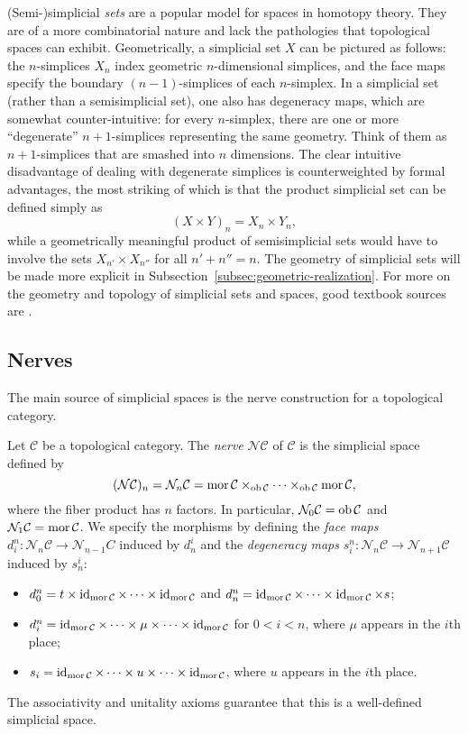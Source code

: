\documentclass[a4paper,openany]{scrbook}
\renewcommand{\C}{\mathcal C}
\newcommand{\nerve}{\mathcal N}
\begin{document}
(Semi-)simplicial \emph{sets} are a popular model for spaces in homotopy theory. They are of a more combinatorial nature and lack the pathologies that topological spaces can exhibit. Geometrically, a simplicial set $X$ can be pictured as follows: the $n$-simplices $X_n$ index geometric $n$-dimensional simplices, and the face maps specify the boundary $(n-1)$-simplices of each $n$-simplex. In a simplicial set (rather than a semisimplicial set), one also has degeneracy maps, which are somewhat counter-intuitive: for every $n$-simplex, there are one or more ``degenerate'' $n+1$-simplices representing the same geometry. Think of them as $n+1$-simplices that are smashed into $n$ dimensions. The clear intuitive disadvantage of dealing with degenerate simplices is counterweighted by formal advantages, the most striking of which is that the product simplicial set can be defined simply as
\[
(X \times Y)_n = X_n \times Y_n,
\]
while a geometrically meaningful product of semisimplicial sets would have to involve the sets $X_{n'} \times X_{n''}$ for all $n'+n''=n$. The geometry of simplicial sets will be made more explicit in Subsection~\ref{subsec:geometric-realization}. For more on the geometry and topology of simplicial sets and spaces, good textbook sources are \cite{goerss-jardine,may:simplicial-objects}.


\subsection{Nerves}\label{subsec:nerve}

The main source of simplicial spaces is the nerve construction for a topological category.


\begin{defn}
Let $\C$ be a topological category. The \emph{nerve} $\nerve\C$ of $\C$ is the simplicial space defined by
\[
(\nerve\C)_n = \nerve_n\C = \mor \C \times_{\ob \C} \cdots \times_{\ob \C} \mor\C,
\]
where the fiber product has $n$ factors. In particular, $\nerve_0 \C = \ob \C$ and $\nerve_1 \C = \mor \C$. We specify the morphisms by defining the \emph{face maps} $d_i^n\colon \nerve_n \C \to \nerve_{n-1} C$ induced by $d^i_n$ and the \emph{degeneracy maps} $s_i^n\colon \nerve_n \C \to \nerve_{n+1} \C$ induced by $s^i_n$:
\begin{itemize}
\item $d^n_0 = t \times \id_{\mor\C} \times \cdots \times \id_{\mor\C}$ and $d_n^n = \id_{\mor\C} \times \cdots \times \id_{\mor\C} \times s$;
\item $d^n_i = \id_{\mor \C} \times \cdots \times \mu \times \cdots \times \id_{\mor \C}$ for $0<i<n$, where $\mu$ appears in the $i$th place;
\item $s_i = \id_{\mor \C} \times \cdots \times u \times \cdots \times \id_{\mor \C}$, where $u$ appears in the $i$th place.
\end{itemize}
The associativity and unitality axioms guarantee that this is a well-defined simplicial space.
\end{defn}
\end{document}
